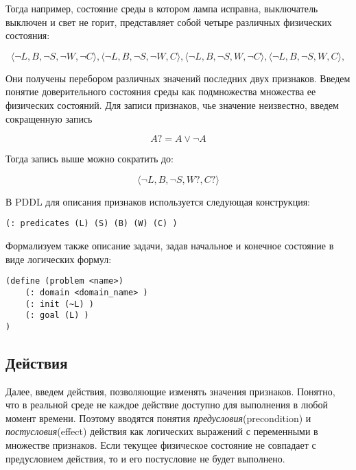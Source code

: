 Тогда например, состояние среды в котором лампа исправна, выключатель
выключен и свет не горит, представляет собой четыре различных физических
состояния:

\begin{equation}\langle \neg L, B, \neg S, \neg W, \neg C\rangle, \langle \neg L, B, \neg S, \neg W, C\rangle, \langle \neg L, B, \neg S, W, \neg C\rangle, \langle \neg L, B, \neg S, W, C\rangle,\end{equation}

Они получены перебором различных значений последних двух признаков.
Введем понятие доверительного состояния среды как подмножества множества
ее физических состояний. Для записи признаков, чье значение неизвестно,
введем сокращенную запись

\begin{equation}A?=A \lor \neg A\end{equation}

Тогда запись выше можно сократить до:

\begin{equation}\langle \neg L, B, \neg S, W?, C?\rangle\end{equation}

В PDDL для описания признаков используется следующая конструкция:

\begin{verbatim}
(: predicates (L) (S) (B) (W) (C) )
\end{verbatim}

Формализуем также описание задачи, задав начальное и конечное состояние
в виде логических формул:

\begin{verbatim}
(define (problem <name>)
    (: domain <domain_name> )
    (: init (~L) )
    (: goal (L) )
)
\end{verbatim}

\subsection{Действия}

Далее, введем действия, позволяющие изменять значения признаков.
Понятно, что в реальной среде не каждое действие доступно для выполнения
в любой момент времени. Поэтому вводятся понятия \emph{предусловия}(precondition) и
\emph{постусловия}(effect) действия как логических выражений с переменными в
множестве признаков. Если текущее физическое состояние не совпадает с
предусловием действия, то и его постусловие не будет выполнено.

